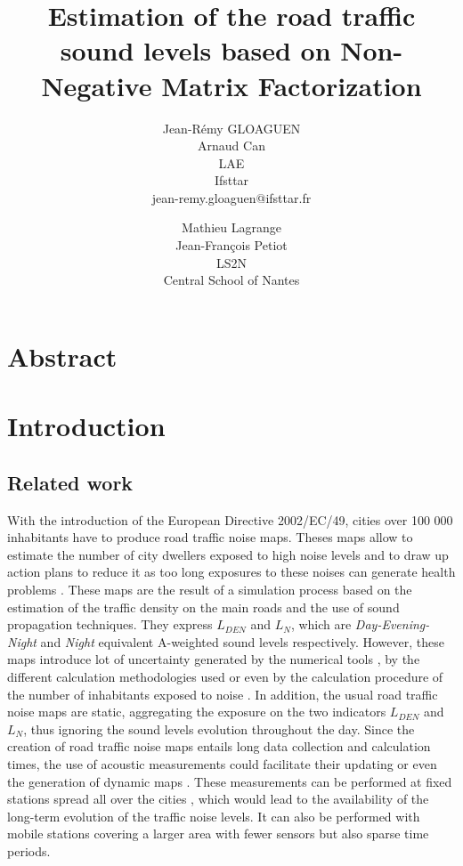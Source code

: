 \documentclass[twocolumn,a4paper,10pt]{article}
\title{Estimation of the road traffic sound levels based on Non-Negative Matrix Factorization}
\author{
    Jean-Rémy GLOAGUEN\\
    Arnaud Can\\
    LAE\\
    Ifsttar\\
    jean-remy.gloaguen@ifsttar.fr
  \and
    Mathieu Lagrange\\
	Jean-François Petiot \\
    LS2N\\
    Central School of Nantes\\
}
\date{}
\newcommand{\ml}[1]{\textcolor{blue}{ Mathieu: #1}}
\begin{document}
\maketitle

\section*{Abstract}

\section{Introduction}
\subsection{Related work}
With the introduction of the European Directive 2002/EC/49, cities over 100 000 inhabitants have to produce road traffic noise maps. Theses maps allow to estimate the number of city dwellers exposed to high noise levels and to draw up action plans to reduce it as too long exposures to these noises can generate health problems \cite{who_burden_2017}. These maps are the result of a simulation process based on the estimation of the traffic density on the main roads and the use of sound propagation techniques. They express $L_ {DEN}$ and $L_N$, which are \textit{Day-Evening-Night} and \textit{Night} equivalent A-weighted sound levels respectively. However, these maps introduce lot of uncertainty generated by the numerical tools \cite{van_leeuwen_noise_2015}, by the different calculation methodologies used \cite{leroy_uncertainty_2010}\cite{garg_critical_2014} or even by the calculation procedure of the number of inhabitants exposed to noise \cite{king_implementation_2011}. In addition, the usual road traffic noise maps are static, aggregating the exposure on the two indicators $L_{DEN}$ and $L_N$, thus ignoring the sound levels evolution throughout the day. Since the creation of road traffic noise maps entails long data collection and calculation times, the use of acoustic measurements could facilitate their updating or even the generation of dynamic maps \cite{wei_dynamic_2016}. These measurements can be performed at fixed stations spread all over the cities \cite{Mioduszewski} \cite{mietlicki2012innovative}, which would lead to the availability of the long-term evolution of the traffic noise levels. It can also be performed with  mobile stations \cite{can_exploring_2012} \cite{manvell2004sadmam} covering a larger area with fewer sensors but also sparse time periods. %
\end{document}
